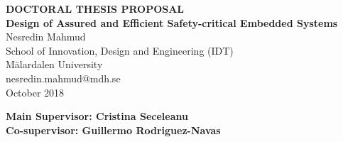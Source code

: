 \documentclass[10pt]{article}
\begin{document}

\begin{center}
\vspace{4cm}

\LARGE \textbf {DOCTORAL THESIS PROPOSAL} \\[3cm]

\LARGE \textbf {Design of Assured and Efficient Safety-critical Embedded Systems} \\[2cm]

\normalsize{Nesredin Mahmud } \\
School of Innovation, Design and Engineering (IDT) \\
M\"{a}lardalen University \\
nesredin.mahmud@mdh.se \\
October 2018\\

\vspace{3cm}

\begin{minipage}{1.0\textwidth}
	\begin{flushright} \small
		\textbf{Main Supervisor: Cristina Seceleanu} \\
		\textbf{Co-supervisor: Guillermo Rodriguez-Navas}
	\end{flushright}
\end{minipage}

\vfill


\end{center}

\newpage
\end{document}

